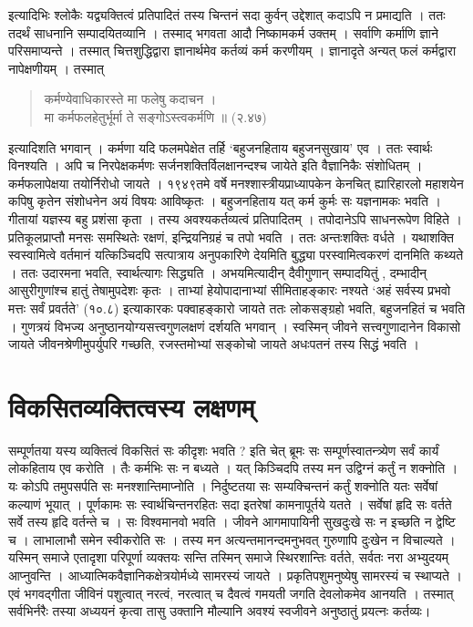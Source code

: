 इत्यादिभिः श्लोकैः यद्व्यक्तित्वं प्रतिपादितं तस्य चिन्तनं सदा कुर्वन् उद्देशात् कदाऽपि न प्रमाद्यति । ततः तदर्थं साधनानि सम्पादयितव्यानि । तस्माद् भगवता आदौ निष्कामकर्म उक्तम् । सर्वाणि कर्माणि ज्ञाने परिसमाप्यन्ते । तस्मात् चित्तशुद्धिद्वारा ज्ञानार्थमेव कर्तव्यं कर्म करणीयम् । ज्ञानादृते अन्यत् फलं कर्मद्वारा नापेक्षणीयम् । तस्मात् 
\begin{verse}
कर्मण्येवाधिकारस्ते मा फलेषु कदाचन । \\
मा कर्मफलहेतुर्भूर्मा ते सङ्गोऽस्त्वकर्मणि ॥ (२.४७)
\end{verse}
इत्यादिशति भगवान् । कर्मणा यदि फलमपेक्षेत तर्हि ‘बहुजनहिताय बहुजनसुखाय' एव । ततः स्वार्थः विनश्यति । अपि च निरपेक्षकर्मणः सर्जनशक्तिर्विलक्षानन्दश्च जायेते इति वैज्ञानिकैः संशोधितम् । कर्मफलापेक्षया तयोर्निरोधो जायते । १९४९तमे वर्षे मनश्शास्त्रीयप्राध्यापकेन केनचित् ह्यारिहारलो महाशयेन कपिषु कृतेन संशोधनेन अयं विषयः आविष्कृतः । बहुजनहिताय यत् कर्म कुर्मः सः यज्ञनामकः भवति । गीतायां यज्ञस्य बहु प्रशंसा कृता । तस्य अवश्यकर्तव्यत्वं प्रतिपादितम् । तपोदानेऽपि साधनरूपेण विहिते । प्रतिकूलप्राप्तौ मनसः समस्थितेः रक्षणं, इन्द्रियनिग्रहं च तपो भवति । ततः अन्तःशक्तिः वर्धते । यथाशक्ति स्वस्वामित्वे वर्तमानं यत्किञ्चिदपि सत्पात्राय अनुपकारिणे देयमिति बुद्ध्या परस्वामित्वकरणं दानमिति कथ्यते । ततः उदारमना भवति, स्वार्थत्यागः सिद्ध्यति । अभयमित्यादीन् दैवीगुणान् सम्पादयितुं , दम्भादीन् आसुरीगुणांश्च हातुं तेषामुपदेशः कृतः । ताभ्यां हेयोपादानाभ्यां सीमिताहङ्कारः नश्यते ‘अहं सर्वस्य प्रभवो मत्तः सर्वं प्रवर्तते' (१०.८) इत्याकारकः पक्वाहङ्कारो जायते ततः लोकसङ्ग्रहो भवति, बहुजनहितं च भवति । गुणत्रयं विभज्य अनुष्ठानयोग्यसत्त्वगुणलक्षणं दर्शयति भगवान् । स्वस्मिन् जीवने सत्त्वगुणादानेन विकासो जायते  जीवनश्रेणीमुपर्युपरि गच्छति, रजस्तमोभ्यां सङ्कोचो जायते अधःपतनं तस्य सिद्धं भवति । 

\section*{विकसितव्यक्तित्वस्य लक्षणम्} 

सम्पूर्णतया यस्य व्यक्तित्वं विकसितं सः कीदृशः भवति ? इति चेत् ब्रूमः सः सम्पूर्णस्वातन्त्र्येण सर्वं कार्यं लोकहिताय एव करोति । तैः कर्मभिः सः न बध्यते । यत् किञ्चिदपि तस्य मन उद्विग्नं कर्तुं न शक्नोति । यः कोऽपि तमुपसर्पति सः मनश्शान्तिमाप्नोति । निर्दुष्टतया सः सम्यक्चिन्तनं कर्तुं शक्नोति यतः सर्वेषां कल्याणं भूयात् । पूर्णकामः सः स्वार्थचिन्तनरहितः सदा इतरेषां कामनापूर्तये यतते । सर्वेषां हृदि सः वर्तते सर्वे तस्य हृदि वर्तन्ते च । सः विश्वमानवो भवति । जीवने आगमापायिनी सुखदुःखे सः न इच्छति न द्वेष्टि च । लाभालाभौ समेन स्वीकरोति सः । तस्य मन अत्यन्तमानन्दमनुभवत् गुरुणापि दुःखेन न विचाल्यते । यस्मिन् समाजे एतादृशा परिपूर्णा व्यक्तयः सन्ति तस्मिन् समाजे स्थिरशान्तिः वर्तते, सर्वतः नरा अभ्युदयम् आप्नुवन्ति । आध्यात्मिकवैज्ञानिकक्षेत्रयोर्मध्ये सामरस्यं जायते । प्रकृतिपशुमनुष्येषु सामरस्यं च स्थाप्यते । एवं भगवद्गीता जीविनं पशुत्वात् नरत्वं, नरत्वात् च दैवत्वं गमयती जगति देवलोकमेव आनयति । तस्मात् सर्वभिर्नरैः तस्या अध्ययनं कृत्वा तासु उक्तानि मौल्यानि अवश्यं स्वजीवने अनुष्ठातुं प्रयत्नः कर्तव्यः। 

\articleend
